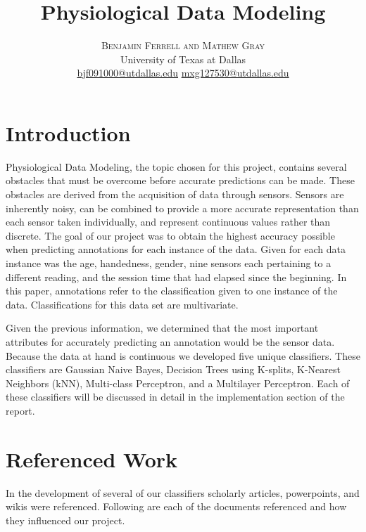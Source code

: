 \documentclass[twoside]{article}
\title{\vspace{-15mm}\fontsize{24pt}{10pt}\selectfont\textbf{Physiological Data Modeling}} %
\author{
\large
\textsc{Benjamin Ferrell and Mathew Gray}\\[2mm] %
\normalsize University of Texas at Dallas \\ %
\normalsize \href{mailto:bjf091000@utdallas.edu}{bjf091000@utdallas.edu}  \href{mailto:mxg127530@utdallas.edu}{mxg127530@utdallas.edu} %
\vspace{-5mm}
}
\date{}
\begin{document}
\maketitle %

\thispagestyle{fancy} %

\begin{multicols}{2}


\section{Introduction}

Physiological Data Modeling, the topic chosen for this project, contains several obstacles that must be overcome before accurate predictions can be made.  These obstacles are derived from the acquisition of data through sensors.  Sensors are inherently noisy, can be combined to provide a more accurate representation than each sensor taken individually, and represent continuous values rather than discrete.  The goal of our project was to obtain the highest accuracy possible when predicting annotations for each instance of the data.  Given for each data instance was the age, handedness, gender, nine sensors each pertaining to a different reading, and the session time that had elapsed since the beginning.  In this paper, annotations refer to the classification given to one instance of the data.  Classifications for this data set are multivariate.

Given the previous information, we determined that the most important attributes for accurately predicting an annotation would be the sensor data.  Because the data at hand is continuous we developed five unique classifiers.  These classifiers are Gaussian Naive Bayes, Decision Trees using K-splits, K-Nearest Neighbors (kNN), Multi-class Perceptron, and a Multilayer Perceptron.  Each of these classifiers will be discussed in detail in the implementation section of the report.

\section{Referenced Work}

In the development of several of our classifiers scholarly articles, powerpoints, and wikis were referenced.  Following are each of the documents referenced and how they influenced our project.


\end{multicols}
\end{document}
